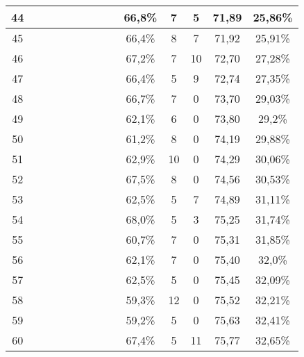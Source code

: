 \begin{longtable}{|c|c|c|c|c|c|c|c|c|c|c|c|c|c|}
44  &  \x    & \x    & \x    &       & \x\m  & \x\m  &       & \x\m  & 66,8\% &  7  & 5  & 71,89 & 25,86\% \\ \hline
45  &  \x    & \x    & \x    & \x    & \x\m  & \x    &       & \x    & 66,4\% &  8  & 7  & 71,92 & 25,91\% \\ \hline
46  &  \x    & \x    & \x    &       & \x\m  &       &       & \x\m  & 67,2\% &  7  & 10 & 72,70 & 27,28\% \\ \hline
47  &  \x    & \x    & \x    &       & \x\m  & \x    &       & \x    & 66,4\% &  5  & 9  & 72,74 & 27,35\% \\ \hline
48  &  \x    & \x    & \x    & \x    & \x\m  &       &       &       & 66,7\% &  7  & 0  & 73,70 & 29,03\% \\ \hline
49  &  \x    & \x    & \x    & \x    &       & \x    & \x\m  &       & 62,1\% &  6  & 0  & 73,80 & 29,2\% \\ \hline
50  &  \x    & \x    & \x    & \x    &       & \x\m  & \x\m  &       & 61,2\% &  8  & 0  & 74,19 & 29,88\% \\ \hline
51  &  \x    & \x    & \x    & \x    & \x    &       & \x\m  &       & 62,9\% &  10 & 0  & 74,29 & 30,06\% \\ \hline
52  &  \x    & \x    & \x    &       & \x\m  & \x    &       &       & 67,5\% &  8  & 0  & 74,56 & 30,53\% \\ \hline
53  &  \x    & \x    & \x    &       & \x    & \x\m  & \x\m  &       & 62,5\% &  5  & 7  & 74,89 & 31,11\% \\ \hline
54  &  \x    & \x    & \x    &       & \x\m  & \x    &       & \x\m  & 68,0\% &  5  & 3  & 75,25 & 31,74\% \\ \hline
55  &  \x    & \x    & \x    & \x    &       & \x\m  &       & \x\m  & 60,7\% &  7  & 0  & 75,31 & 31,85\% \\ \hline
56  &  \x    & \x    & \x    & \x    & \x    & \x    & \x\m  &       & 62,1\% &  7  & 0  & 75,40 & 32,0\% \\ \hline
57  &  \x    & \x    & \x    & \x    & \x    & \x\m  &       &       & 62,5\% &  5  & 0  & 75,45 & 32,09\% \\ \hline
58  &  \x    & \x    & \x    &       &       &       &       & \x\m  & 59,3\% &  12 & 0  & 75,52 & 32,21\% \\ \hline
59  &  \x    & \x    & \x    &       &       & \x    &       &       & 59,2\% &  5  & 0  & 75,63 & 32,41\% \\ \hline
60  &  \x    & \x    & \x    &       & \x\m  &       &       &       & 67,4\% &  5  & 11 & 75,77 & 32,65\% \\ \hline

\end{longtable}

